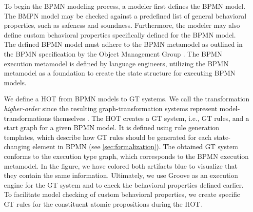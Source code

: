 \documentclass{lmcs} %
\begin{document}
To begin the BPMN modeling process, a modeler first defines the BPMN model. 
The BMPN model may be checked against a predefined list of general behavioral properties, such as safeness and soundness.
Furthermore, the modeler may also define custom behavioral properties specifically defined for the BPMN model.
The defined BPMN model must adhere to the BPMN metamodel as outlined in the BPMN specification by the Object Management Group \cite{objectmanagementgroupBusinessProcessModel2013}.
The BPMN execution metamodel is defined by language engineers, utilizing the BPMN metamodel as a foundation to create the state structure for executing BPMN models. 



We define a HOT from BPMN models to GT systems.
We call the transformation \textit{higher-order} since the resulting graph-transformation systems represent model-transformations themselves \cite{tisiUseHigherOrderModel2009}.
The HOT creates a GT system, i.e., GT rules, and a start graph for a given BPMN model.
It is defined using rule generation templates, which describe how GT rules should be generated for each state-changing element in BPMN (see \autoref{sec:formalization}).
The obtained GT system conforms to the execution type graph, which corresponds to the BPMN execution metamodel.
In the figure, we have colored both artifacts blue to visualize that they contain the same information.
Ultimately, we use Groove as an execution engine for the GT system and to check the behavioral properties defined earlier.
To facilitate model checking of custom behavioral properties, we create specific GT rules for the constituent atomic propositions during the HOT.
\end{document}
